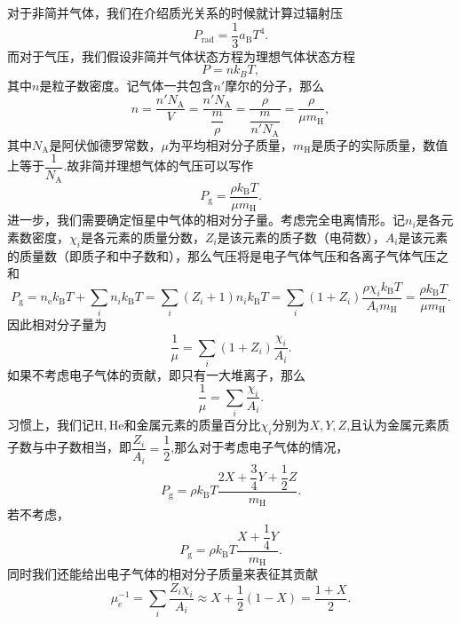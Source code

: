 \documentclass[../天体物理基础.tex]{subfiles}
\begin{document}
对于非简并气体，我们在介绍质光关系的时候就计算过辐射压
\begin{equation}
P_{\text{rad}}=\frac{1}{3}a_{\text{B}}T^{4}.
\end{equation}
而对于气压，我们假设非简并气体状态方程为理想气体状态方程
\begin{equation}
P=nk_{B}T,
\end{equation}
其中$n$是粒子数密度。记气体一共包含$n'$摩尔的分子，那么
\begin{equation}
n=\frac{n'N_{\text{A}}}{V}=\frac{n'N_{\text{A}}}{\dfrac{m}{\rho}}=\frac{\rho}{\dfrac{m}{n'N_{\text{A}}}}=\frac{\rho}{\mu m_{\mathrm{H}}},
\end{equation}
其中$N_{\text{A}}$是阿伏伽德罗常数，$\mu$为平均相对分子质量，$m_{\mathrm{H}}$是质子的实际质量，数值上等于$\dfrac{1}{N_{\text{A}}}$.故非简并理想气体的气压可以写作
\begin{equation}
P_{\text{g}}=\frac{\rho k_{\text{B}}T}{\mu m_{\mathrm{H}}}.
\end{equation}
进一步，我们需要确定恒星中气体的相对分子量。考虑完全电离情形。记$n_{i}$是各元素数密度，$\chi_{i}$是各元素的质量分数，$Z_{i}$是该元素的质子数（电荷数），$A_{i}$是该元素的质量数（即质子和中子数和），那么气压将是电子气体气压和各离子气体气压之和
\begin{equation}
P_{\text{g}}=n_{\text{e}}k_{\text{B}}T+\sum_{i}n_{i}k_{\text{B}}T=\sum_{i}\left(Z_{i}+1\right)n_{i}k_{\text{B}}T=\sum_{i}\left(1+Z_{i}\right)\frac{\rho\chi_{i}k_{\text{B}}T}{A_{i}m_{\mathrm{H}}}=\frac{\rho k_{\text{B}}T}{\mu m_{\mathrm{H}}}.
\end{equation}
因此相对分子量为
\begin{equation}
\frac{1}{\mu}=\sum_{i}\left(1+Z_{i}\right)\frac{\chi_{i}}{A_{i}}.
\end{equation}
如果不考虑电子气体的贡献，即只有一大堆离子，那么
\begin{equation}
\frac{1}{\mu}=\sum_{i}\frac{\chi_{i}}{A_{i}}.
\end{equation}
习惯上，我们记$\mathrm{H},\mathrm{He}$和金属元素的质量百分比$\chi_{i}$分别为$X,Y,Z$,且认为金属元素质子数与中子数相当，即$\dfrac{Z_{i}}{A_{i}}=\dfrac{1}{2}$,那么对于考虑电子气体的情况，
\begin{equation}
P_{\text{g}}=\rho k_{\text{B}}T\frac{2X+\dfrac{3}{4}Y+\dfrac{1}{2}Z}{m_{\mathrm{H}}}.
\end{equation}
若不考虑，
\begin{equation}
P_{\text{g}}=\rho k_{\text{B}}T\frac{X+\dfrac{1}{4}Y}{m_{\mathrm{H}}}.
\end{equation}
同时我们还能给出电子气体的相对分子质量来表征其贡献
\begin{equation}
\mu_{e}^{-1}=\sum_{i}\frac{Z_{i}\chi_{i}}{A_{i}}\approx X+\frac{1}{2}(1-X)=\frac{1+X}{2}.
\end{equation}
\end{document}
